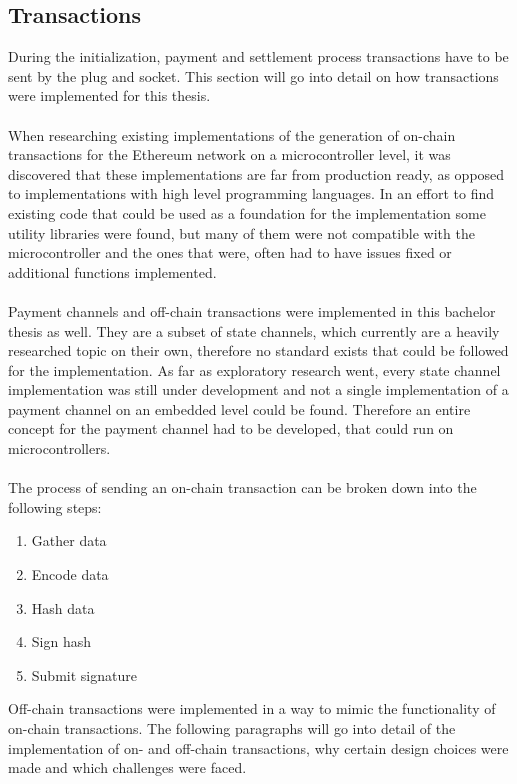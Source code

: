 \subsection{Transactions}
During the initialization, payment and settlement process transactions have to be sent by the plug and socket.
This section will go into detail on how transactions were implemented for this thesis.
\\\\
When researching existing implementations of the generation of on-chain transactions for the Ethereum network on a microcontroller level, it was discovered that these implementations are far from production ready, as opposed to implementations with high level programming languages.
In an effort to find existing code that could be used as a foundation for the implementation some utility libraries were found, but many of them were not compatible with the microcontroller and the ones that were, often had to have issues fixed or additional functions implemented.
\\\\
Payment channels and off-chain transactions were implemented in this bachelor thesis as well.
They are a subset of state channels, which currently are a heavily researched topic on their own, therefore no standard exists that could be followed for the implementation.
As far as exploratory research went, every state channel implementation was still under development and not a single implementation of a payment channel on an embedded level could be found\cite{state-channels}.
Therefore an entire concept for the payment channel had to be developed, that could run on microcontrollers.
\\\\
The process of sending an on-chain transaction can be broken down into the following steps: 
\begin{enumerate}
    \item Gather data
    \item Encode data
    \item Hash data
    \item Sign hash
    \item Submit signature
\end{enumerate}
Off-chain transactions were implemented in a way to mimic the functionality of on-chain transactions.
The following paragraphs will go into detail of the implementation of on- and off-chain transactions, why certain design choices were made and which challenges were faced.
\\\\\\
